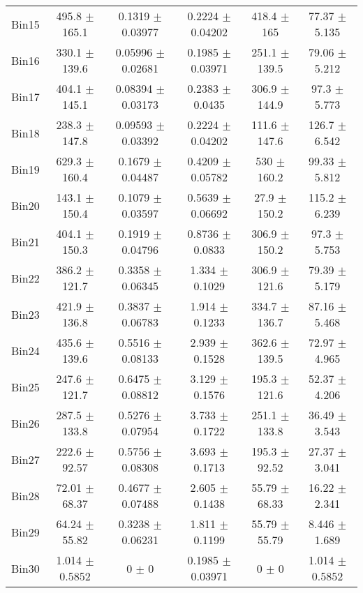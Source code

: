 \begin{tabular}{@{\extracolsep{4pt}}lccccc@{}}
     Bin15 & 495.8 $\pm$ 165.1 & 0.1319 $\pm$ 0.03977 & 0.2224 $\pm$ 0.04202 & 418.4 $\pm$ 165 & 77.37 $\pm$ 5.135 \\ 
     Bin16 & 330.1 $\pm$ 139.6 & 0.05996 $\pm$ 0.02681 & 0.1985 $\pm$ 0.03971 & 251.1 $\pm$ 139.5 & 79.06 $\pm$ 5.212 \\ 
     Bin17 & 404.1 $\pm$ 145.1 & 0.08394 $\pm$ 0.03173 & 0.2383 $\pm$ 0.0435 & 306.9 $\pm$ 144.9 & 97.3 $\pm$ 5.773 \\ 
     Bin18 & 238.3 $\pm$ 147.8 & 0.09593 $\pm$ 0.03392 & 0.2224 $\pm$ 0.04202 & 111.6 $\pm$ 147.6 & 126.7 $\pm$ 6.542 \\ 
     Bin19 & 629.3 $\pm$ 160.4 & 0.1679 $\pm$ 0.04487 & 0.4209 $\pm$ 0.05782 & 530 $\pm$ 160.2 & 99.33 $\pm$ 5.812 \\ 
     Bin20 & 143.1 $\pm$ 150.4 & 0.1079 $\pm$ 0.03597 & 0.5639 $\pm$ 0.06692 & 27.9 $\pm$ 150.2 & 115.2 $\pm$ 6.239 \\ 
     Bin21 & 404.1 $\pm$ 150.3 & 0.1919 $\pm$ 0.04796 & 0.8736 $\pm$ 0.0833 & 306.9 $\pm$ 150.2 & 97.3 $\pm$ 5.753 \\ 
     Bin22 & 386.2 $\pm$ 121.7 & 0.3358 $\pm$ 0.06345 & 1.334 $\pm$ 0.1029 & 306.9 $\pm$ 121.6 & 79.39 $\pm$ 5.179 \\ 
     Bin23 & 421.9 $\pm$ 136.8 & 0.3837 $\pm$ 0.06783 & 1.914 $\pm$ 0.1233 & 334.7 $\pm$ 136.7 & 87.16 $\pm$ 5.468 \\ 
     Bin24 & 435.6 $\pm$ 139.6 & 0.5516 $\pm$ 0.08133 & 2.939 $\pm$ 0.1528 & 362.6 $\pm$ 139.5 & 72.97 $\pm$ 4.965 \\ 
     Bin25 & 247.6 $\pm$ 121.7 & 0.6475 $\pm$ 0.08812 & 3.129 $\pm$ 0.1576 & 195.3 $\pm$ 121.6 & 52.37 $\pm$ 4.206 \\ 
     Bin26 & 287.5 $\pm$ 133.8 & 0.5276 $\pm$ 0.07954 & 3.733 $\pm$ 0.1722 & 251.1 $\pm$ 133.8 & 36.49 $\pm$ 3.543 \\ 
     Bin27 & 222.6 $\pm$ 92.57 & 0.5756 $\pm$ 0.08308 & 3.693 $\pm$ 0.1713 & 195.3 $\pm$ 92.52 & 27.37 $\pm$ 3.041 \\ 
     Bin28 & 72.01 $\pm$ 68.37 & 0.4677 $\pm$ 0.07488 & 2.605 $\pm$ 0.1438 & 55.79 $\pm$ 68.33 & 16.22 $\pm$ 2.341 \\ 
     Bin29 & 64.24 $\pm$ 55.82 & 0.3238 $\pm$ 0.06231 & 1.811 $\pm$ 0.1199 & 55.79 $\pm$ 55.79 & 8.446 $\pm$ 1.689 \\ 
     Bin30 & 1.014 $\pm$ 0.5852 & 0 $\pm$ 0 & 0.1985 $\pm$ 0.03971 & 0 $\pm$ 0 & 1.014 $\pm$ 0.5852 \\ 
\hline\hline
  \end{tabular}

